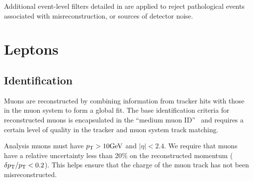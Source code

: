 Additional event-level filters detailed in \cite{CMS:JetMETFilters} are applied 
to reject pathological events associated with misreconstruction, or sources of 
detector noise.

\section{Leptons}

\subsection{Identification}

Muons are reconstructed by combining information from tracker hits
with those in the muon system to form a global fit.
The base identification criteria for reconstructed muons is encapsulated in the 
``medium muon ID''~\cite{CMS:Sirunyan2019yvv} and requires
a certain level of quality in the tracker and muon system track matching.

Analysis muons must have $p_{\mathrm{T}}>10\text{GeV}$ and $|\eta|<2.4$. 
We require that muons have a relative 
uncertainty less than 20\% on the reconstructed momentum ($\delta p_{\mathrm{T}}/p_{\mathrm{T}}<0.2$).
This helps ensure that the charge of the muon track has not been misreconstructed.

